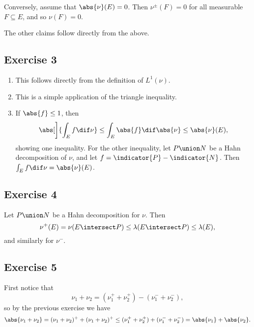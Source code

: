 \documentclass[article, a4paper, 11pt, oneside]{memoir}
\numberwithin{equation}{chapter}
\begin{document}
Conversely, assume that $\abs{\nu}(E) = 0$. Then $\nu^\pm(F) = 0$ for all measurable $F \subseteq E$, and so $\nu(F) = 0$.

The other claims follow directly from the above.


\subsection{Exercise 3}

\begin{enumerate}[label=(\alph*)]
	\item This follows directly from the definition of $L^1(\nu)$.
	
	\item This is a simple application of the triangle inequality.

	\item If $\abs{f} \leq 1$, then
	\begin{equation*}
		\abs[\bigg]{ \int_E f \dif\nu }
			\leq \int_E \abs{f} \dif\abs{\nu}
			\leq \abs{\nu}(E),
	\end{equation*}
	showing one inequality. For the other inequality, let $P \union N$ be a Hahn decomposition of $\nu$, and let $f = \indicator{P} - \indicator{N}$. Then $\int_E f \dif\nu = \abs{\nu}(E)$.
\end{enumerate}


\subsection{Exercise 4}

Let $P \union N$ be a Hahn decomposition for $\nu$. Then
%
\begin{equation*}
	\nu^+(E)
		= \nu(E \intersect P)
		\leq \lambda(E \intersect P)
		\leq \lambda(E),
\end{equation*}
%
and similarly for $\nu^-$.


\subsection{Exercise 5}

First notice that
%
\begin{equation*}
	\nu_1 + \nu_2
		= (\nu_1^+ + \nu_2^+) - (\nu_1^- + \nu_2^-),
\end{equation*}
%
so by the previous exercise we have
%
\begin{equation*}
	\abs{\nu_1 + \nu_2}
		= (\nu_1 + \nu_2)^+ + (\nu_1 + \nu_2)^+
		\leq (\nu_1^+ + \nu_2^+) + (\nu_1^- + \nu_2^-)
		= \abs{\nu_1} + \abs{\nu_2}.
\end{equation*}
\end{document}
